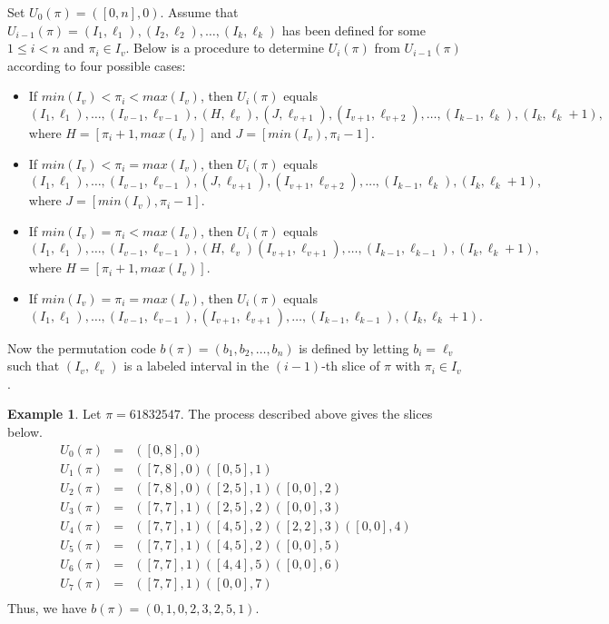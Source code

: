 \documentclass[12pt]{amsart}
\theoremstyle{plain}
\theoremstyle{definition}
\theoremstyle{example}
\newtheorem{example}{Example}
\theoremstyle{remark}
\numberwithin{equation}{section}
\numberwithin{figure}{section}
\begin{document}
Set $U_0(\pi)=([0,n], 0)$. Assume that $U_{i-1}(\pi)=(I_1, \ell_1),(I_2, \ell_2),\ldots, (I_k, \ell_k)$ has been defined for some
$1\leq i<n$ and $\pi_i\in I_v$.  Below is a procedure to determine $U_{i}(\pi)$ from $U_{i-1}(\pi)$ according to four possible cases:
 \begin{itemize}
 \item If  $min(I_v)<\pi_i<max(I_v)$, then $U_i(\pi)$ equals
 $$
 (I_1, \ell_1), \ldots, (I_{v-1}, \ell_{v-1}),(H, \ell_v), (J, \ell_{v+1}), (I_{v+1}, \ell_{v+2}),\ldots, (I_{k-1}, \ell_k), (I_{k}, \ell_k+1),
 $$
 where $H=[\pi_{i}+1, max(I_v)]$  and $J=[min(I_v), \pi_i-1 ]$.
 \item If  $min(I_v)<\pi_i=max(I_v)$, then $U_i(\pi)$ equals
 $$
(I_1, \ell_1), \ldots, (I_{v-1}, \ell_{v-1}),  (J, \ell_{v+1}), (I_{v+1}, \ell_{v+2}), \ldots, (I_{k-1}, \ell_{k}), (I_{k }, \ell_k+1),
 $$
 where $J=[min(I_v), \pi_i-1 ]$.
 \item If  $min(I_v)=\pi_i<max(I_v)$, then $U_i(\pi)$ equals
 $$
 (I_1, \ell_1), \ldots, (I_{v-1}, \ell_{v-1}),  (H, \ell_{v})(I_{v+1}, \ell_{v+1}), \ldots, (I_{k-1}, \ell_{k-1}), (I_{k }, \ell_k+1),
 $$
 where $H=[\pi_{i}+1, max(I_v)]$.

 \item If  $min(I_v)=\pi_i=max(I_v)$, then  $U_i(\pi)$ equals
 $$
 (I_1, \ell_1), \ldots, (I_{v-1}, \ell_{v-1}),  (I_{v+1}, \ell_{v+1}),\ldots,  (I_{k-1}, \ell_{k-1}), (I_{k }, \ell_k+1).
 $$
 \end{itemize}
 Now the permutation code $b(\pi)=(b_1,b_2,\ldots, b_n)$ is defined by letting $b_i=\ell_v$ such that $(I_v, \ell_v)$ is a labeled interval in the $(i-1)$-th slice of $\pi$ with $\pi_i\in I_v$.

\begin{example}
Let $\pi=61832547$. The process described above gives the slices below.
$$
\begin{array}{lll}
U_0(\pi)&=& ([0,8], 0)\\
U_1(\pi)&=& ([7,8], 0)([0,5], 1)\\
U_2(\pi)&=& ([7,8], 0)([2,5], 1)([0,0], 2) \\
U_3(\pi)&=&([7,7], 1)([2,5], 2)([0,0], 3)\\
U_4(\pi)&=&([7,7], 1)([4,5], 2)([2,2], 3)([0,0], 4)\\
U_5(\pi)&=& ([7,7], 1)([4,5], 2)([0,0], 5)\\
U_6(\pi)&=& ([7,7], 1)([4,4], 5)([0,0], 6)\\
U_7(\pi)&=&([7,7], 1)([0,0], 7)  \\
\end{array}
$$
Thus, we have $b(\pi)=(0,1,0,2,3,2,5,1)$.
\end{example}
\end{document}
